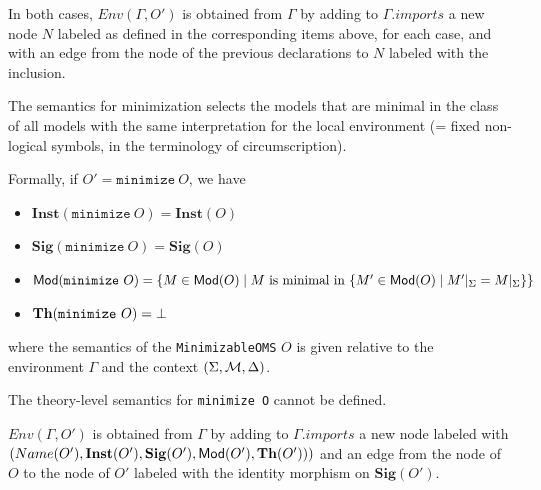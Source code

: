 \documentclass[10pt,fleqn,%
\ifpretendfinal
final%
\else
draft%
\fi,
]{scrreprt}
\newcommand*{\syntax}[1]{\texttt{#1}}
\newcommand{\Sig}{\mathbf{Sig}}
\newcommand{\Inst}{\ensuremath{\mathbf{Inst}}}
\newcommand{\semdom}[1]{
\begin{center}
\fbox{$#1$}
\end{center}
}
\begin{document}
 In both cases, $Env(\Gamma, O')$ is obtained from $\Gamma$ by adding to $\Gamma.imports$ a new
node $N$ labeled as defined in the corresponding items above, for each case,
and with an edge from the node of the previous declarations 
to $N$ labeled with the inclusion. 


% 

 
\semdom{sem(\Gamma, (\Sigma, \cM, \Delta), \syntax{ExtendingOMS})=
(\Gamma',(\cI,\Sigma',\cM', \bot))}

The semantics for minimization selects the models that are minimal
in the class of all models with the same interpretation for the
local environment (= fixed non-logical symbols, in the terminology of circumscription).

Formally, if $O' = \syntax{minimize}\ O$, we have
\begin{itemize}
 \item $\Inst(\syntax{minimize}\ O)= \Inst(O)$
 \item $\Sig(\syntax{minimize}\ O) = \Sig(O)$
 \item $\Mod( \syntax{minimize}\ O) = 
        \{ M \in  \Mod(O) \mid  M \text{ is minimal in } \{M' \in \Mod(O) \mid M'\forget\Sigma = M\forget\Sigma\}\}$
 \item $\Th( \syntax{minimize}\ O) = \bot$ 
\end{itemize}
\noindent where the semantics of the \syntax{MinimizableOMS} $O$ is given relative to 
the environment
$\Gamma$ and the context $(\Sigma, {\cal M}, \Delta)$.

The theory-level semantics for  \syntax{minimize O} cannot be defined.

$Env(\Gamma, O')$ is obtained from $\Gamma$ by adding to $\Gamma.imports$ a new
node labeled with $(Name(O'), \Inst(O'),\allowbreak \Sig(O'), \Mod(O'), \Th(O')))$ and
an edge from the node of $O$ to the node of $O'$ labeled with the identity
morphism on $\Sig(O')$.
\end{document}
